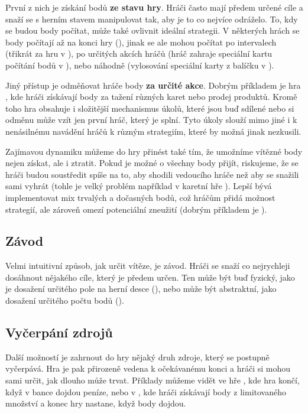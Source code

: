 První z nich je získání bodů \textbf{ze stavu hry}. Hráči často mají předem určené cíle a snaží se s herním stavem manipulovat tak, aby je to co nejvíce odráželo. To, kdy se budou body počítat, může také ovlivnit ideální strategii. V některých hrách se body počítají až na konci hry (), jinak se ale mohou počítat po intervalech (třikrát za hru v ), po určitých akcích hráčů (hráč zahraje speciální kartu počítání bodů v ), nebo náhodně (vylosování speciální karty z balíčku v ).

Jiný přístup je odměňovat hráče body \textbf{za určité akce}. Dobrým příkladem je hra , kde hráči získávají body za tažení různých karet nebo prodej produktů. Kromě toho hra obsahuje i složitější mechanismus úkolů, které jsou buď sdílené nebo si odměnu může vzít jen první hráč, který je splní. Tyto úkoly slouží mimo jiné i k nenásilnému navádění hráčů k různým strategiím, které by možná jinak nezkusili.

Zajímavou dynamiku můžeme do hry přinést také tím, že umožníme vítězné body nejen získat, ale i ztratit. Pokud je možné o všechny body přijít, riskujeme, že se hráči budou soustředit spíše na to, aby shodili vedoucího hráče než aby se snažili sami vyhrát (tohle je velký problém například v karetní hře ). Lepší bývá implementovat mix trvalých a dočasných bodů, což hráčům přidá možnost strategií, ale zároveň omezí potenciální zneužití (dobrým příkladem je ).

\subsection{Závod}
\label{subsec:end_race}

Velmi intuitivní způsob, jak určit vítěze, je závod. Hráči se snaží co nejrychleji dosáhnout nějakého cíle, který je předem určen. Ten může být buď fyzický, jako je dosažení určitého pole na herní desce (), nebo může být abstraktní, jako dosažení určitého počtu bodů ().

\subsection{Vyčerpání zdrojů}
\label{subsec:end_resource_depletion}

Další možností je zahrnout do hry nějaký druh zdroje, který se postupně vyčerpává. Hra je pak přirozeně vedena k očekávanému konci a hráči si mohou sami určit, jak dlouho může trvat. Příklady můžeme vidět ve hře , kde hra končí, když v bance dojdou peníze, nebo v , kde hráči získávají body z limitovaného množství a konec hry nastane, když body dojdou.

